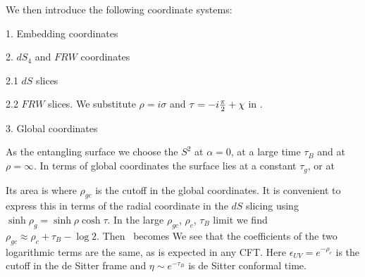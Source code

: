 We then introduce the following coordinate systems:
\item{1.} Embedding coordinates
\eqn{}
\item{2.} $dS_4$ and $FRW$ coordinates
 \item{2.1}  $dS$ slices
\eqn{}
\item{2.2}   $FRW$ slices. We substitute $\rho = i \sigma $ and $\tau = -i {\pi \over 2} + \chi$ in \dsads .
\eqn{}
\item{3.} Global coordinates
\eqn{}

As the entangling surface we choose the $S^2$ at $\alpha=0$, at a large time $\tau_B$ and at $\rho=\infty$.
In terms of global coordinates the surface lies at a constant $\tau_{g}$, or at

\eqn{}
Its area is
\eqn{}
where $\rho_{gc}$ is the cutoff in the global coordinates. It is convenient to express this in terms
of the radial coordinate in the $dS$ slicing
 using $\sinh \rho_{g} = \sinh{\rho} \cosh \tau$.  In the large $\rho_{gc}$, $\rho_c$, $\tau_B$ limit
 we find  $\rho_{gc} \approx \rho_c + \tau_B   - \log 2 $.  Then \entcft\ becomes
\eqn{}
We see that the coefficients of the two logarithmic terms are the same, as is expected in any CFT. Here
$\epsilon_{UV} = e^{ - \rho_c}$ is the cutoff in the de Sitter frame and $\eta \sim e^{ -\tau_B}$ is
de Sitter conformal
time.


